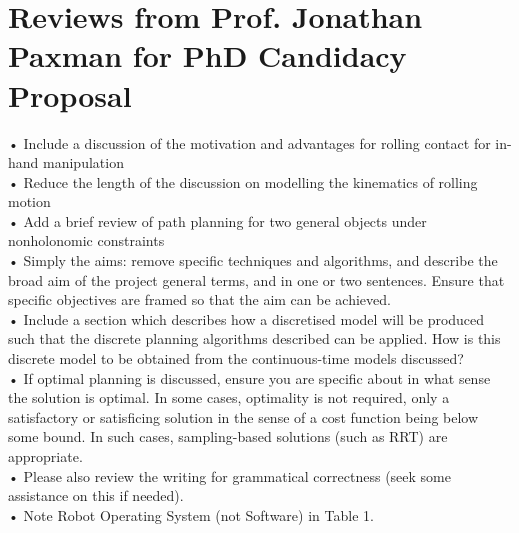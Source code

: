 \documentclass{article}
\begin{document}
%
\tableofcontents
\thispagestyle{empty}
\clearpage

\setcounter{page}{1}














%
%

\newpage
\section{Reviews from Prof. Jonathan Paxman for PhD Candidacy Proposal}
• Include a discussion of the motivation and advantages for rolling contact for in-hand manipulation\\
•	Reduce the length of the discussion on modelling the kinematics of rolling motion\\
•	Add a brief review of path planning for two general objects under nonholonomic constraints\\
•	Simply the aims: remove specific techniques and algorithms, and describe the broad aim of the project general terms, and in one or two sentences. Ensure that specific objectives are framed so that the aim can be achieved.\\
•	Include a section which describes how a discretised model will be produced such that the discrete planning algorithms described can be applied. How is this discrete model to be obtained from the continuous-time models discussed?\\
•	If optimal planning is discussed, ensure you are specific about in what sense the solution is optimal. In some cases, optimality is not required, only a satisfactory or satisficing solution in the sense of a cost function being below some bound. In such cases, sampling-based solutions (such as RRT) are appropriate.\\
•	Please also review the writing for grammatical correctness (seek some assistance on this if needed).\\
•	Note Robot Operating System (not Software) in Table 1.\\

\cleardoublepage
\printbibliography
\end{document}
